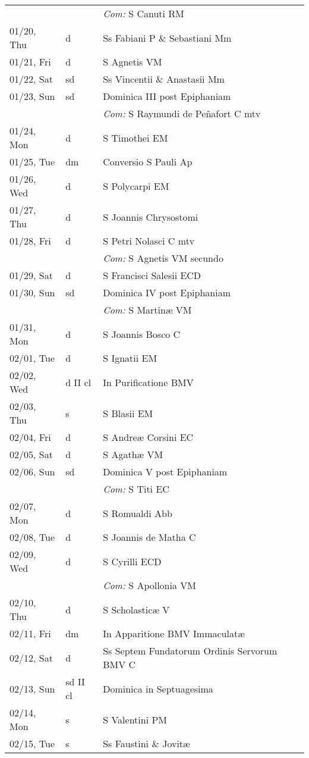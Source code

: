 \documentclass[10pt]{article}
\begin{document}
\begin{longtable}{ l l l }
 & & \textit{Com:} S Canuti RM\\
01/20, Thu & d & Ss Fabiani P \& Sebastiani Mm\\
01/21, Fri & d & S Agnetis VM\\
01/22, Sat & sd & Ss Vincentii \& Anastasii Mm\\
01/23, Sun & sd & Dominica III post Epiphaniam\\
 & & \textit{Com:} S Raymundi de Peñafort C mtv\\
01/24, Mon & d & S Timothei EM\\
01/25, Tue & dm & Conversio S Pauli Ap\\
01/26, Wed & d & S Polycarpi EM\\
01/27, Thu & d & S Joannis Chrysostomi\\
01/28, Fri & d & S Petri Nolasci C mtv\\
 & & \textit{Com:} S Agnetis VM secundo\\
01/29, Sat & d & S Francisci Salesii ECD\\
01/30, Sun & sd & Dominica IV post Epiphaniam\\
 & & \textit{Com:} S Martinæ VM\\
01/31, Mon & d & S Joannis Bosco C\\
02/01, Tue & d & S Ignatii EM\\
02/02, Wed & d II cl & In Purificatione BMV\\
02/03, Thu & s & S Blasii EM\\
02/04, Fri & d & S Andreæ Corsini EC\\
02/05, Sat & d & S Agathæ VM\\
02/06, Sun & sd & Dominica V post Epiphaniam\\
 & & \textit{Com:} S Titi EC\\
02/07, Mon & d & S Romualdi Abb\\
02/08, Tue & d & S Joannis de Matha C\\
02/09, Wed & d & S Cyrilli ECD\\
 & & \textit{Com:} S Apollonia VM\\
02/10, Thu & d & S Scholasticæ V\\
02/11, Fri & dm & In Apparitione BMV Immaculatæ\\
02/12, Sat & d & Ss Septem Fundatorum Ordinis Servorum BMV C\\
02/13, Sun & sd II cl & Dominica in Septuagesima\\
02/14, Mon & s & S Valentini PM\\
02/15, Tue & s & Ss Faustini \& Jovitæ\\

\end{longtable}
\end{document}
